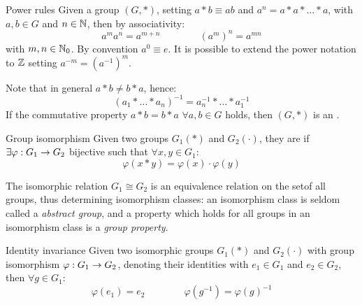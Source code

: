 \begin{example}{Power rules}{}
  Given a group $ (G,*) $, setting $ a * b \equiv ab $ and $ a^n = a * a * \dots * a $, with $ a,b \in G $ and $ n \in \mathbb{N} $, then by associativity:
  \begin{equation}
    a^m a^n = a^{m+n}
    \qquad \qquad
    (a^m)^n = a^{mn}
  \end{equation}
  with $ m,n \in \mathbb{N}_0 $. By convention $ a^0 \equiv e $. It is possible to extend the power notation to $ \mathbb{Z} $ setting $ a^{-m} = (a^{-1})^m $.
\end{example}

Note that in general $ a * b \neq b * a $, hence:
\begin{equation}
  (a_1 * \dots * a_n)^{-1} = a_n^{-1} * \dots * a_1^{-1}
\end{equation}
If the commutative property $ a * b = b * a \,\,\forall a,b \in G $ holds, then $ (G,*) $ is an .

\begin{definition}{Group isomorphism}{}
  Given two groups $ G_1(*) $ and $ G_2(\cdot) $, they are  if $ \exists \varphi : G_1 \rightarrow G_2 $ bijective such that $ \forall x,y \in G_1 $:
  \begin{equation}
    \varphi(x * y) = \varphi(x) \cdot \varphi(y)
    \label{eq:group-isomorphism-def}
  \end{equation}
\end{definition}

The isomorphic relation $ G_1 \cong G_2 $ is an equivalence relation on the set\footnotemark of all groups, thus determining isomorphism classes: an isomorphism class is seldom called a \emph{abstract group}, and a property which holds for all groups in an isomorphism class is a \emph{group property}.


\begin{proposition}{Identity invariance}{}
  Given two isomorphic groups $ G_1(*) $ and $ G_2(\cdot) $ with group isomorphism $ \varphi : G_1 \rightarrow G_2 $, denoting their identities with $ e_1 \in G_1 $ and $ e_2 \in G_2 $, then $ \forall g \in G_1 $:
  \begin{equation}
    \varphi(e_1) = e_2
    \qquad \qquad
    \varphi(g^{-1}) = \varphi(g)^{-1}
  \end{equation}
\end{proposition}

